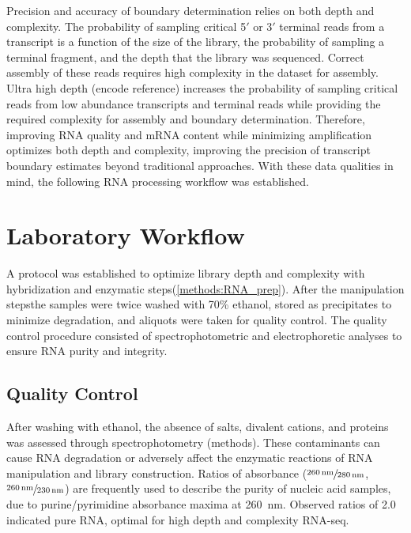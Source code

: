 Precision and accuracy of boundary determination relies on both depth and complexity. The probability of sampling critical 5$\prime$ or 3$\prime$ terminal reads from a transcript is a function of the size of the library, the probability of sampling a terminal fragment, and the depth that the library was sequenced. Correct assembly of these reads requires high complexity in the dataset for assembly. Ultra high depth (encode reference) increases the probability of sampling critical reads from low abundance transcripts and terminal reads while providing the required complexity for assembly and boundary determination. Therefore, improving RNA quality and mRNA content while minimizing amplification optimizes both depth and complexity, improving the precision of transcript boundary estimates beyond traditional approaches. With these data qualities in mind, the following RNA processing workflow was established.



\section{Laboratory Workflow}
A protocol was established to optimize library depth and complexity with hybridization and enzymatic steps(\ref{methods:RNA_prep}). After the manipulation stepsthe samples were twice washed with 70\% ethanol, stored as precipitates to minimize degradation, and aliquots were taken for quality control. The quality control procedure consisted of spectrophotometric and electrophoretic analyses to ensure RNA purity and integrity.

\subsection{Quality Control}
After washing with ethanol, the absence of salts, divalent cations, and proteins was assessed through spectrophotometry (methods). These contaminants can cause RNA degradation or adversely affect the enzymatic reactions of RNA manipulation and library construction. Ratios of absorbance ($\sfrac{\SI{260}{\nano\meter}}{\SI{280}{\nano\meter}}$, $\sfrac{\SI{260}{\nano\meter}}{\SI{230}{\nano\meter}}$) are frequently used to describe the purity of nucleic acid samples, due to purine/pyrimidine absorbance maxima at \SI{260}{\nano\meter}. Observed ratios of 2.0 indicated pure RNA, optimal for high depth and complexity RNA-seq. 

